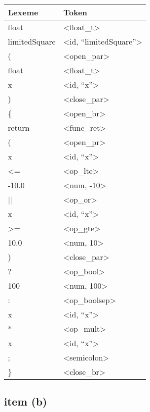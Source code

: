 \documentclass[10pt]{article}
\begin{document}
\begin{table}[H]
\centering
\begin{tabular}{p{4cm}l}
\bfseries Lexeme         & \bfseries  Token                    \\
\hline
 float          &  <float\_t>                \\
 limitedSquare  &  <id, ``limitedSquare''>  \\
 (              &  <open\_par>                 \\
 float          &  <float\_t>                \\
 x              &  <id, ``x''>              \\
 )              &  <close\_par>                \\
 \{             &  <open\_br>                 \\
 return         &  <func\_ret>               \\
 (              &  <open\_pr>                 \\
 x              &  <id, ``x''>              \\
 <=             &  <op\_lte>                 \\
 -10.0          &  <num, -10>               \\
 ||             &  <op\_or>                  \\
 x              &  <id, ``x''>              \\
 >=             &  <op\_gte>                 \\
 10.0           &  <num, 10>                \\
 )              &  <close\_par>                \\
 ?              &  <op\_bool>                \\
 100            &  <num, 100>               \\
  :             &  <op\_boolsep>             \\
 x              &  <id, ``x''>              \\
 \**              &  <op\_mult>                \\
 x              &  <id, ``x''>              \\
 ;              &  <semicolon>              \\
 \}             &  <close\_br>                \\
\end{tabular}
\end{table}

\subsection*{item (b)}
\end{document}
